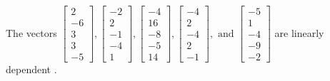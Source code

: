 \begin{exercise}
\begin{exerciseStatement}
  \end{exerciseStatement}
  \begin{exerciseAnswer}
   The vectors \(\left[\begin{array}{r}
2 \\
-6 \\
3 \\
3 \\
-5
\end{array}\right] , \left[\begin{array}{r}
-2 \\
2 \\
-1 \\
-4 \\
1
\end{array}\right] , \left[\begin{array}{r}
-4 \\
16 \\
-8 \\
-5 \\
14
\end{array}\right] , \left[\begin{array}{r}
-4 \\
2 \\
-4 \\
2 \\
-1
\end{array}\right] , \text{ and } \left[\begin{array}{r}
-5 \\
1 \\
-4 \\
-9 \\
-2
\end{array}\right]\) are 
  	 linearly dependent  .
  


  \end{exerciseAnswer}
\end{exercise}